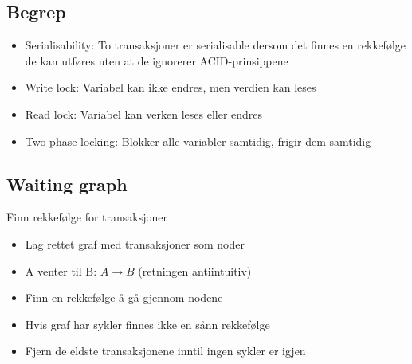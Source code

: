\subsection*{Begrep}
\begin{frame}
\begin{itemize}[<+->]
    \item Serialisability: To transaksjoner er serialisable dersom det finnes en rekkefølge de kan utføres uten at de ignorerer ACID-prinsippene
    \item Write lock: Variabel kan ikke endres, men verdien kan leses 
    \item Read lock: Variabel kan verken leses eller endres
    \item Two phase locking: Blokker alle variabler samtidig, frigir dem samtidig
\end{itemize}
\end{frame}

\subsection*{Waiting graph}
\begin{frame}{Finn rekkefølge for transaksjoner}
\begin{itemize}[<+->]
    \item Lag rettet graf med transaksjoner som noder
    \item A venter til B: $A \rightarrow B$ (retningen antiintuitiv)
    \item Finn en rekkefølge å gå gjennom nodene
    \item Hvis graf har sykler finnes ikke en sånn rekkefølge
    \item Fjern de eldste transaksjonene inntil ingen sykler er igjen
\end{itemize}
\end{frame}

